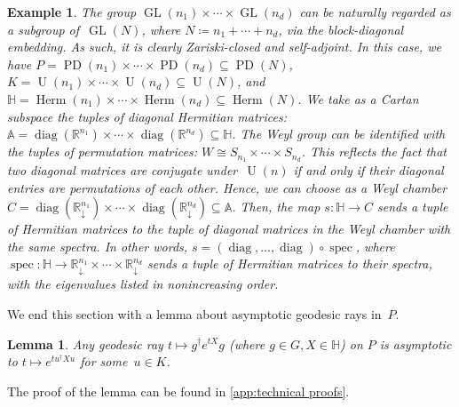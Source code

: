 \documentclass[11pt,letterpaper]{article}
\newtheorem{lemma}[theorem]{Lemma}\AddToHook{env/lemma/begin}{\crefalias{theorem}{lemma}}
\newtheorem{example}[theorem]{Example}\AddToHook{env/example/begin}{\crefalias{theorem}{example}}
\numberwithin{equation}{section}
\renewcommand{\AA}{\mathbb{A}}
\newcommand{\RR}{\mathbb{R}}
\newcommand{\bbH}{\mathbb{H}}
\DeclareMathOperator{\PD}{PD}
\DeclareMathOperator{\U}{U}
\DeclareMathOperator{\spec}{spec}
\DeclareMathOperator{\GL}{GL}
\DeclareMathOperator{\diag}{diag}
\DeclareMathOperator{\Herm}{Herm}
\begin{document}
\begin{example}\label{ex:gl}
    The group $\GL(n_1)\times\cdots\times\GL(n_d)$ can be naturally regarded as a subgroup of~$\GL(N)$, where $N \coloneqq n_1+\cdots+n_d$, via the block-diagonal embedding.
    As such, it is clearly Zariski-closed and self-adjoint.
    In this case, we have $P = \PD(n_1)\times\cdots\times\PD(n_d) \subseteq \PD(N)$, $K = \U(n_1)\times\cdots\times\U(n_d) \subseteq \U(N)$, and $\bbH = \Herm(n_1)\times\cdots\times\Herm(n_d) \subseteq \Herm(N)$.
    We take as a Cartan subspace the tuples of diagonal Hermitian matrices: $\AA=\diag(\RR^{n_1})\times\cdots\times\diag(\RR^{n_d}) \subseteq \bbH$.
    The Weyl group can be identified with the tuples of permutation matrices: $W \cong S_{n_1}\times\cdots\times S_{n_d}$.
    This reflects the fact that two diagonal matrices are conjugate under~$\U(n)$ if and only if their diagonal entries are permutations of each other.
    Hence, we can choose as a Weyl chamber $C = \diag(\RR^{n_1}_{\downarrow})\times\cdots\times\diag(\RR^{n_d}_{\downarrow}) \subseteq \AA$.
    Then, the map $s \colon \bbH \to C$ sends a tuple of Hermitian matrices to the tuple of diagonal matrices in the Weyl chamber with the same spectra.
    In other words, $s = (\diag,\dots,\diag)\circ\spec$, where $\spec \colon \bbH \to \RR^{n_1}_{\downarrow}\times\cdots\times\RR^{n_d}_{\downarrow}$ sends a tuple of Hermitian matrices to their spectra, with the eigenvalues listed in nonincreasing order.
\end{example}

We end this section with a lemma about asymptotic geodesic rays in~$P$.

\begin{lemma}\label{lem:asymptoticrays}
    Any geodesic ray $t \mapsto g^\dagger e^{tX}g$ (where $g \in G, X \in \bbH$) on $P$ is asymptotic to $t \mapsto e^{tu^\dagger Xu}$ for some~$u \in K$.
\end{lemma}

\noindent
The proof of the lemma can be found in \cref{app:technical proofs}.


\end{document}
